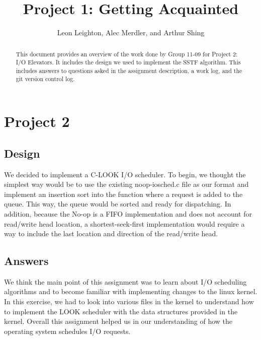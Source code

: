 \documentclass[journal, letterpaper, draftclsnofoot, onecolumn, 10pt]{IEEEtran}
\begin{document}
\title{Project 1: Getting Acquainted}
\author{Leon Leighton, Alec Merdler, and Arthur Shing}

\begin{titlepage}
    \centering
    \maketitle
    \begin{abstract}
      This document provides an overview of the work done by Group 11-09 for Project 2: I/O Elevators.
      It includes the design we used to implement the SSTF algorithm.
      This includes answers to questions asked in the assignment description, a work log, and the git version control log.
    \end{abstract}


\end{titlepage}
\tableofcontents
\clearpage

\section{Project 2}

\subsection{Design}

We decided to implement a C-LOOK I/O scheduler. To begin, we thought the simplest way would be to use the existing noop-iosched.c file
as our format and implement an insertion sort into the function where a request is added to the queue. This way, the queue would be
sorted and ready for dispatching. In addition, because the No-op is a FIFO implementation and does not account for read/write head
location, a shortest-seek-first implementation would require a way to include the last location and direction of the read/write head.
 \\



\subsection{Answers}


We think the main point of this assignment was to learn about I/O scheduling algorithms and to become familiar with implementing
changes to the linux kernel. In this exercise, we had to look into various files in the kernel to understand how to implement
the LOOK scheduler with the data structures provided in the kernel. Overall this assignment helped us in our understanding of
how the operating system schedules I/O requests. \\
\end{document}
